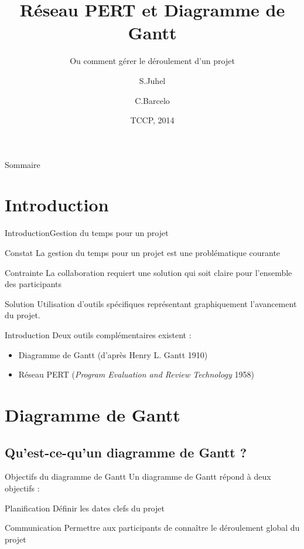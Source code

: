\documentclass[handout]{beamer}
\title{Réseau PERT et Diagramme de Gantt}
\subtitle{Ou comment gérer le déroulement d'un projet}
\author{S.Juhel \and C.Barcelo}
\institute[UM2]
{
  Département informatique
  Université de Montpellier 2
}
\date{TCCP, 2014}
\begin{document}
\begin{frame}
  \titlepage
\end{frame}

\begin{frame}{Sommaire}
  \tableofcontents
\end{frame}

\section{Introduction}

\begin{frame}{Introduction}{Gestion du temps pour un projet}
    \begin{block}{Constat}
        La gestion du temps pour un projet est une problématique courante
    \end{block}
    \pause
    \begin{block}{Contrainte}
        La collaboration requiert une solution qui soit claire pour l'ensemble des participants
    \end{block}
    \pause
    \begin{block}{Solution}
        Utilisation d'outils spécifiques représentant graphiquement l'avancement du projet.
    \end{block}
\end{frame}

\begin{frame}{Introduction}
    Deux outils complémentaires existent :
    \begin{itemize}
    \item {Diagramme de Gantt (d'après Henry L. Gantt 1910)}
    \item {Réseau PERT (\textit{Program Evaluation and Review Technology} 1958)}
    \end{itemize}
\end{frame}


\section{Diagramme de Gantt}
    
\subsection{Qu'est-ce-qu'un diagramme de Gantt ?}

\begin{frame}{Objectifs du diagramme de Gantt}
    Un diagramme de Gantt répond à deux objectifs :
    \pause
    \begin{block}{Planification}
        Définir les dates clefs du projet
    \end{block}
    \pause
    \begin{block}{Communication}
        Permettre aux participants de connaître le déroulement global du projet
    \end{block}
\end{frame}
\end{document}
